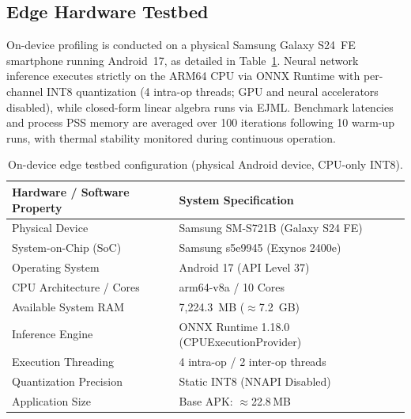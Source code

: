 \subsection{Edge Hardware Testbed}
\label{sec:edge_hardware_testbed}
On-device profiling is conducted on a physical Samsung Galaxy S24~FE smartphone running Android~17, as detailed in Table~\ref{tab:device_spec}. Neural network inference executes strictly on the ARM64 CPU via ONNX Runtime with per-channel INT8 quantization (4 intra-op threads; GPU and neural accelerators disabled), while closed-form linear algebra runs via EJML. Benchmark latencies and process PSS memory are averaged over 100 iterations following 10 warm-up runs, with thermal stability monitored during continuous operation.

\begin{table}[htbp]
\caption{On-device edge testbed configuration (physical Android device, CPU-only INT8).}
\label{tab:device_spec}
\centering
\footnotesize
\begin{tabular}{ll}
\toprule
\textbf{Hardware / Software Property} & \textbf{System Specification} \\
\midrule
Physical Device & Samsung SM-S721B (Galaxy S24 FE) \\
System-on-Chip (SoC) & Samsung s5e9945 (Exynos 2400e) \\
Operating System & Android 17 (API Level 37) \\
CPU Architecture / Cores & arm64-v8a / 10 Cores \\
Available System RAM & 7,224.3~MB ($\approx$7.2~GB) \\
Inference Engine & ONNX Runtime 1.18.0 (CPUExecutionProvider) \\
Execution Threading & 4 intra-op / 2 inter-op threads \\
Quantization Precision & Static INT8 (NNAPI Disabled) \\
Application Size & Base APK: $\approx$22.8\,MB \\
\bottomrule
\end{tabular}
\end{table}
